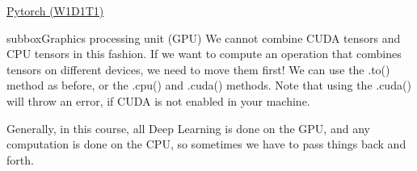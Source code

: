 \begin{multicols}{3}
\begin{textbox}{\href{https://deeplearning.neuromatch.io/tutorials/W1D1_BasicsAndPytorch/student/W1D1_Tutorial1.html}{Pytorch (W1D1T1) }}
\begin{subbox}{subbox}{Graphics processing unit (GPU)}
We cannot combine CUDA tensors and CPU tensors in this fashion. If we want to compute an operation that combines tensors on different devices, we need to move them first! We can use the .to() method as before, or the .cpu() and .cuda() methods. Note that using the .cuda() will throw an error, if CUDA is not enabled in your machine.

Generally, in this course, all Deep Learning is done on the GPU, and any computation is done on the CPU, so sometimes we have to pass things back and forth.

\end{subbox}
\end{textbox}

\end{multicols}